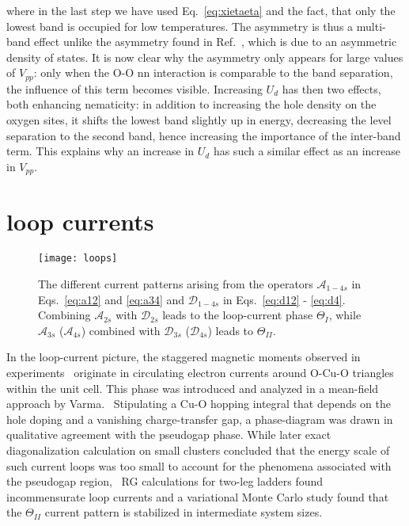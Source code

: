 \documentclass[prb, twocolumn,showpacs,preprintnumbers,amsmath,amssymb, floatfix]{revtex4}
\begin{document}
where in the last step we have used Eq.~\eqref{eq:xietaeta} and the fact, that only the lowest band is occupied for low temperatures. The asymmetry is thus a multi-band effect unlike the asymmetry found in Ref.~\cite{yamase:2005}, which is due to an asymmetric density of states. It is now clear why the asymmetry only appears for large values of $V_{pp}$: only when the O-O nn interaction is comparable to the band separation, the influence of this term becomes visible. Increasing $U_d$ has then two effects, both enhancing nematicity: in addition to increasing the hole density on the oxygen sites, it shifts the lowest band slightly up in energy, decreasing the level separation to the second band, hence increasing the importance of the inter-band term. This explains why an increase in $U_d$ has such a similar effect as an increase in $V_{pp}$.

\section{loop currents}
\label{sec:loop}
\begin{figure}[tb]
  \begin{center}
    \texttt{[image: loops]}
  \end{center}
  \caption{The different current patterns arising from the operators $\mathcal{A}_{1-4 s}$ in Eqs.~\eqref{eq:a12} and \eqref{eq:a34} and $\mathcal{D}_{1-4 s}$ in Eqs.~\eqref{eq:d12} - \eqref{eq:d4}. Combining $\mathcal{A}_{2s}$ with $\mathcal{D}_{2s}$ leads to the loop-current phase $\Theta_{I}$, while $\mathcal{A}_{3s}$ ($\mathcal{A}_{4s}$) combined with $\mathcal{D}_{3s}$ ($\mathcal{D}_{4s}$) leads to $\Theta_{II}$.}
  \label{fig:loops}
\end{figure}
In the loop-current picture, the staggered magnetic moments observed in experiments~\cite{fauque:2006} originate in circulating electron currents around O-Cu-O triangles within the unit cell. This phase was introduced and analyzed in a mean-field approach by Varma.~\cite{varma:2006b} Stipulating a Cu-O hopping integral that depends on the hole doping and a vanishing charge-transfer gap, a phase-diagram was drawn in qualitative agreement with the pseudogap phase. 
While later exact diagonalization calculation on small clusters concluded that the energy scale of such current loops was too small to account for the phenomena associated with the pseudogap region,~\cite{greiter:2008} RG calculations for two-leg ladders found incommensurate loop currents\cite{chudzinski:2007} and a variational Monte Carlo study found that the $\Theta_{II}$ current pattern is stabilized in intermediate system sizes\cite{weber:2009}.
\end{document}
